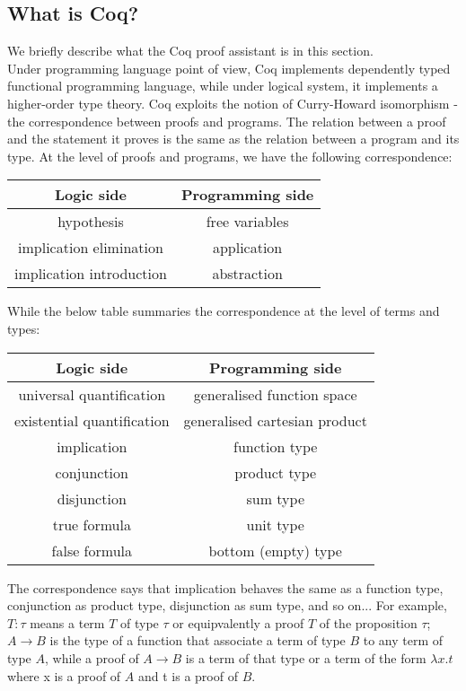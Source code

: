 \subsection{What is Coq?}
We briefly describe what the Coq proof assistant is in this section.\\
Under programming language point of view, Coq implements dependently typed functional programming language, while under logical system, it implements a higher-order type theory. Coq exploits the notion of Curry-Howard isomorphism - the correspondence between proofs and programs. The relation between a proof and the statement it proves is the same as the relation between a program and its type. At the level of proofs and programs, we have the following correspondence:
\begin{center}
	\begin{tabular}{|c|c|}
		\hline 
		Logic side & Programming side \\ \hline
		hypothesis & free variables \\ \hline
		implication elimination & application \\ \hline
		implication introduction & abstraction \\ \hline
	\end{tabular}
\end{center}
While the below table summaries the correspondence at the level of terms and types:
\begin{center}
	\begin{tabular}{|c|c|}
		\hline
			Logic side & Programming side \\ \hline 
			universal quantification & generalised function space \\ \hline
			existential quantification & generalised cartesian product \\ \hline
			implication	& function type \\ \hline
			conjunction	& product type \\ \hline
			disjunction	& sum type \\ \hline
			true formula & unit type \\ \hline
			false formula & bottom (empty) type \\ \hline
	\end{tabular}
\end{center}
The correspondence says that implication behaves the same as a function type, conjunction as product type, disjunction as sum type, and so on... For example, $T:\tau$ means a term $T$ of type $\tau$ or equipvalently a proof $T$ of the proposition $\tau$; $A \rightarrow B$ is the type of a function that associate a term of type $B$ to any term of type $A$, while a proof of $A \rightarrow B$ is a term of that type or a term of the form $\lambda x.t$ where x is a proof of $A$ and t is a proof of $B$. \\
